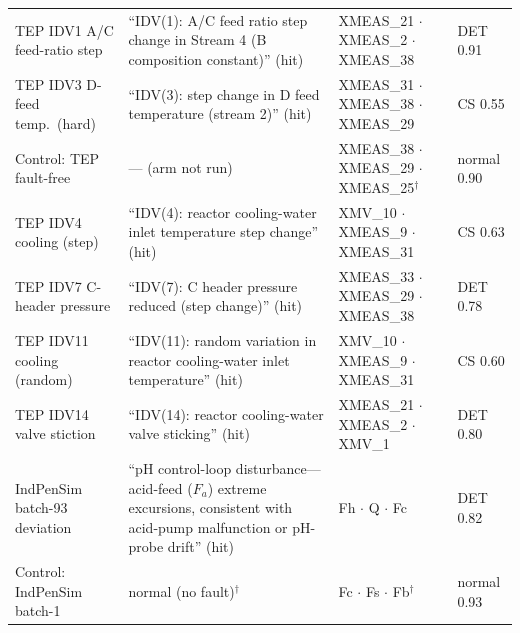 \documentclass[preprint,10pt]{elsarticle}
\begin{document}
\begin{table}[!t]
{\begin{tabular}{@{}p{3.0cm}p{5.6cm}p{4.6cm}p{2.6cm}@{}}
TEP IDV1 A/C feed-ratio step & ``IDV(1): A/C feed ratio step change in Stream 4 (B composition constant)'' (hit) & XMEAS\_21 $\cdot$ XMEAS\_2 $\cdot$ XMEAS\_38 & DET 0.91 \\
TEP IDV3 D-feed temp.\ (hard) & ``IDV(3): step change in D feed temperature (stream 2)'' (hit) & XMEAS\_31 $\cdot$ XMEAS\_38 $\cdot$ XMEAS\_29 & CS 0.55 \\
Control: TEP fault-free & --- (arm not run) & XMEAS\_38 $\cdot$ XMEAS\_29 $\cdot$ XMEAS\_25$^\dagger$ & normal 0.90 \\
TEP IDV4 cooling (step) & ``IDV(4): reactor cooling-water inlet temperature step change'' (hit) & XMV\_10 $\cdot$ XMEAS\_9 $\cdot$ XMEAS\_31 & CS 0.63 \\
TEP IDV7 C-header pressure & ``IDV(7): C header pressure reduced (step change)'' (hit) & XMEAS\_33 $\cdot$ XMEAS\_29 $\cdot$ XMEAS\_38 & DET 0.78 \\
TEP IDV11 cooling (random) & ``IDV(11): random variation in reactor cooling-water inlet temperature'' (hit) & XMV\_10 $\cdot$ XMEAS\_9 $\cdot$ XMEAS\_31 & CS 0.60 \\
TEP IDV14 valve stiction & ``IDV(14): reactor cooling-water valve sticking'' (hit) & XMEAS\_21 $\cdot$ XMEAS\_2 $\cdot$ XMV\_1 & DET 0.80 \\
\midrule
IndPenSim batch-93 deviation & ``pH control-loop disturbance---acid-feed ($F_a$) extreme excursions, consistent with acid-pump malfunction or pH-probe drift'' (hit) & Fh $\cdot$ Q $\cdot$ Fc & DET 0.82 \\
Control: IndPenSim batch-1 & normal (no fault)$^\dagger$ & Fc $\cdot$ Fs $\cdot$ Fb$^\dagger$ & normal 0.93 \\
\bottomrule
\end{tabular}%
}
\end{table}
\end{document}
